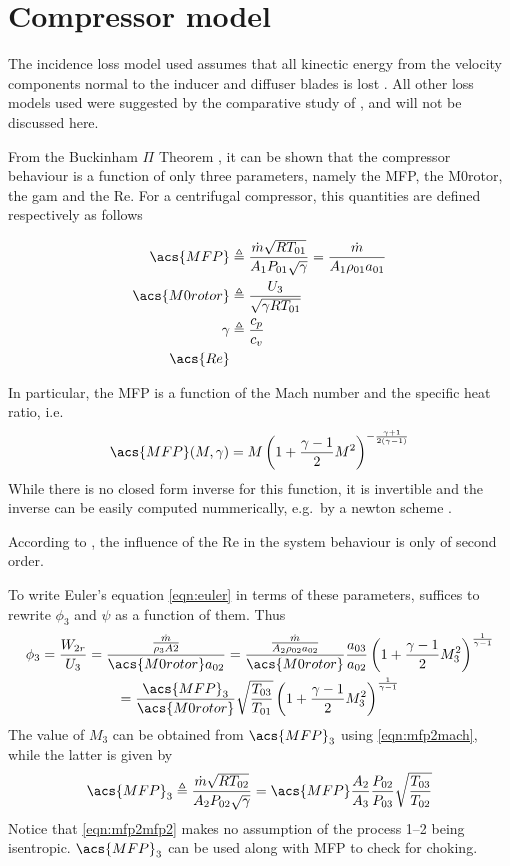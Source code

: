 \documentclass[tcc]{subfiles}
\begin{document}
\section{Compressor model}

The incidence loss model used assumes that all kinectic energy from the velocity components
normal to the inducer and diffuser blades is lost \cite{Stanitz1953}.
All other loss models used were suggested by the comparative study of \textcite{Oh1997}, 
and will not be discussed here.



From the Buckinham $\Pi$ Theorem \cite{Buckingham1914}, 
it can be shown that the compressor behaviour is a function of only three parameters, 
namely the \acl{MFP}, the \acl{M0rotor}, the \acl{gam} and the \acl{Re}. 
For a centrifugal compressor, this quantities are defined respectively as follows

\begin{align}
    \acs{MFP} &\triangleq \MFP{1} = \MFPalt{1} \\
    \acs{M0rotor} &\triangleq \frac{U_3}{\sqrt{\gamma R T_{01}}} \\
    \gamma &\triangleq \frac{c_p}{c_v} \\
    \acs{Re} &
\end{align}

In particular, the \acl{MFP} is a function of the Mach number and the specific heat ratio,
 i.e.\
\begin{equation}
    \label{eqn:mfp2mach}
    \acs{MFP}(M,\gamma) = M \left( 1 + \frac{\gamma-1}{2}M^2\right)^{-\frac{\gamma+1}{2(\gamma-1)}}
\end{equation}
While there is no closed form inverse for this function, it is invertible and the inverse can be easily computed nummerically, e.g.\ by a newton scheme \cite{Der1974}.

According to \textcite{walsh2004gas},
 the influence of the \acl{Re} in the system behaviour is only of second order.

To write Euler's equation \cref{eqn:euler} in terms of these parameters, suffices to rewrite $\phi_3$ and $\psi$ as a function of them. Thus
\begin{multline}
    \label{eqn:phi2_dimensionless}
    \phi_3 = \frac{W_{2r}}{U_3} 
           = \frac{\frac{\dot{m}}{\rho_3 A2}}{\acs{M0rotor} a_{02}}
           = \frac{\MFPalt{2}}{\acs{M0rotor}} \frac{a_{03}}{a_{02}} \stagdensratio{3} \\ 
           = \frac{\acs{MFP}_3}{\acs{M0rotor}} \sqrt{\frac{T_{03}}{T_{01}}} \stagdensratio{3}
\end{multline}
The value of $M_3$ can be obtained from $\acs{MFP}_3$ using \cref{eqn:mfp2mach}, while the latter is given by
\begin{equation}
    \label{eqn:mfp2mfp2}
    \acs{MFP}_3 \triangleq \MFP{2} = \acs{MFP} \frac{A_2}{A_3} \frac{P_{02}}{P_{03}} \sqrt{\frac{T_{03}}{T_{02}}}
\end{equation}
Notice that \cref{eqn:mfp2mfp2} makes no assumption of the process 1--2 being isentropic. $\acs{MFP}_3$ can be used along with \acs{MFP} to check for choking.
\end{document}
